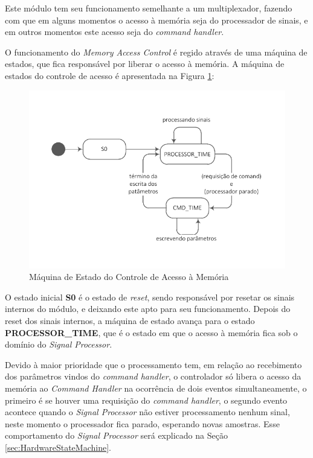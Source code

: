 \documentclass[monografia]{subfiles}
\begin{document}
		Este módulo tem seu funcionamento semelhante a um multiplexador, fazendo com que em alguns momentos o acesso à memória seja do processador de sinais,
		e em outros momentos este acesso seja do \textit{command handler}. 

		O funcionamento do \textit{Memory Access Control} é regido através de uma máquina de estados, que fica responsável por liberar o acesso à memória. 
		A máquina de estados do controle de acesso é apresentada na Figura \ref{fig:memControlAccessStatemachine}:

			\begin{figure}[!h]
			\centering
			\includegraphics[scale=1.2]{img/stateMachines/memControlAccess.pdf}
			\caption{Máquina de Estado do Controle de Acesso à Memória}
			\label{fig:memControlAccessStatemachine}
			\end{figure}

		O estado inicial \textbf{S0} é o estado de \textit{reset}, sendo responsável por resetar os sinais internos do módulo, e deixando este apto para 
		seu funcionamento. Depois do reset dos sinais internos, a máquina de estado avança para o estado \textbf{PROCESSOR\_TIME}, que é o estado em que
		o acesso à memória fica sob o domínio do \textit{Signal Processor}. 

		Devido à maior prioridade que o processamento tem, em relação ao recebimento dos parâmetros vindos do \textit{command handler}, o controlador só
		libera o acesso da memória ao \textit{Command Handler} na ocorrência de dois eventos simultaneamente, o primeiro é se houver uma requisição do 
		\textit{command handler}, o segundo evento acontece quando o \textit{Signal Processor} não estiver processamento nenhum sinal, 
		neste momento o processador fica parado, esperando novas amostras. Esse comportamento do \textit{Signal Processor} 
		será explicado na Seção \ref{sec:HardwareStateMachine}. 
\end{document}
